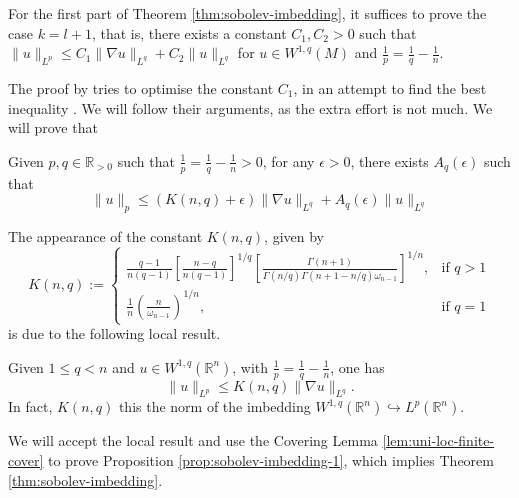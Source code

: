 \documentclass[11pt]{article}
\begin{document}
For the first part of Theorem \ref{thm:sobolev-imbedding}, it suffices to prove the case
\(k=l+1\), that is, there exists a constant \(C_1, C_2>0\) such that
\(\|u\|_{L^p} \leq C_1\|\nabla u\|_{L^q} + C_2\| u\|_{L^q}\) for
\(u\in W^{1,q}(M)\) and \(\frac{1}{p} = \frac{1}{q}-\frac{1}{n}\).

The proof by \cite{aubin_nonlinear_1998} tries to optimise the constant \(C_1\), in an
attempt to find the best inequality \cite[page 50]{aubin_nonlinear_1998}. We will follow
their arguments, as the extra effort is not much. We will prove that

\begin{proposition}
\label{prop:sobolev-imbedding-1}
Given \(p,q\in \mathbb{R}_{>0}\) such that \(\frac{1}{p}=\frac{1}{q} - \frac{1}{n}>0\),
for any \(\epsilon >0\), there exists \(A_q(\epsilon)\) such that
\[
 \|u\|_p \leq (K(n,q) + \epsilon) \|\nabla u\|_{L^q} + A_q(\epsilon) \| u\|_{L^q}
\]
\end{proposition}
The appearance of the constant \(K(n,q)\), given by 
\[
K(n,q):=\begin{cases}
\frac{q-1}{n(q-1)}\left[\frac{n-q}{n(q-1)}\right]^{1/q}\left[\frac{\Gamma(n+1)}{\Gamma(n/q)\Gamma(n+1-n/q)\omega_{n-1}}\right]^{1/n},  & \text{if $q>1$} \\
\frac{1}{n}\left(\frac{n}{\omega_{n-1}}\right)^{1/n}, & \text{if $q=1$}
\end{cases}
\] 
is due to the following local result.
\begin{theorem}[Aubin]
\label{thm:aubin-loc}
Given \(1\leq q < n\) and \(u\in W^{1,q}(\mathbb{R}^n)\), with \(\frac{1}{p}=\frac{1}{q}-\frac{1}{n}\), one has
\[
 \|u\|_{L^p} \leq K(n,q) \|\nabla u\|_{L^q}.
\]
In fact, \(K(n,q)\) this the norm of the imbedding \(W^{1,q}(\mathbb{R}^n) \hookrightarrow L^p(\mathbb{R}^n)\).
\end{theorem}

We will accept the local result and use the Covering Lemma \ref{lem:uni-loc-finite-cover} to
prove Proposition \ref{prop:sobolev-imbedding-1}, which implies Theorem
\ref{thm:sobolev-imbedding}.
\end{document}

